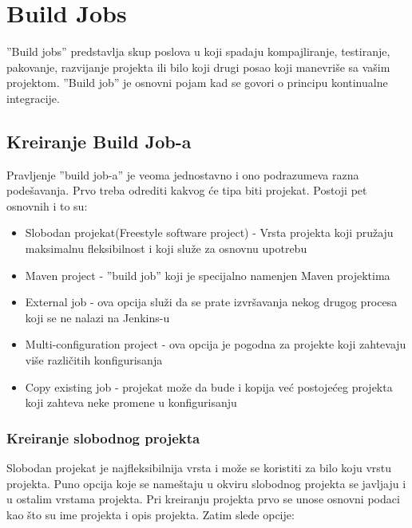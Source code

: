\section{Build Jobs}

''Build jobs'' predstavlja skup poslova u koji spadaju kompajliranje, testiranje, pakovanje, razvijanje projekta ili bilo koji drugi posao koji manevriše sa vašim projektom. ''Build job'' je osnovni pojam kad se govori o principu kontinualne integracije.

\subsection{Kreiranje Build Job-a}

Pravljenje ''build job-a'' je veoma jednostavno i ono podrazumeva razna podešavanja. Prvo treba odrediti kakvog će tipa biti projekat. Postoji pet osnovnih i to su:
\begin{itemize}  
\item Slobodan projekat(Freestyle software project) - Vrsta projekta koji pružaju maksimalnu fleksibilnost i koji služe za osnovnu upotrebu
\item Maven project - ''build job'' koji je specijalno namenjen Maven projektima
\item External job - ova opcija služi da se prate izvršavanja nekog drugog procesa koji se ne nalazi na Jenkins-u
\item Multi-configuration project - ova opcija je pogodna za projekte koji zahtevaju više različitih konfigurisanja
\item Copy existing job - projekat može da bude i kopija već postojećeg projekta koji zahteva neke promene u konfigurisanju
\end{itemize}  

\subsubsection{Kreiranje slobodnog projekta}

Slobodan projekat je najfleksibilnija vrsta i može se koristiti za bilo koju vrstu projekta. Puno opcija koje se nameštaju u okviru slobodnog projekta se javljaju i u ostalim vrstama projekta. Pri kreiranju projekta prvo se unose osnovni podaci kao što su ime projekta i opis projekta. Zatim slede opcije:

